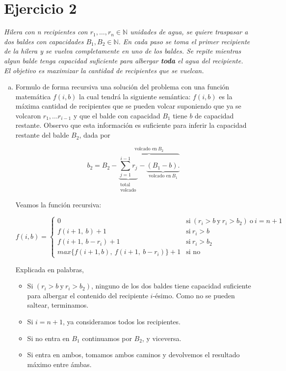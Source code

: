 \documentclass[12pt, a4paper]{report}
\theoremstyle{definition} %
\begin{document}
\section*{Ejercicio 2}

\textit{Hilera con n recipientes con $r_1, \ldots, r_n \in \mathbb{N}$ unidades de agua, se quiere traspasar a dos baldes con capacidades $B_1, B_2 \in \mathbb{N}$. En cada paso se toma el primer recipiente de la hilera y se vuelva completamente en uno de los baldes. Se repite mientras algun balde tenga capacidad suficiente para albergar \textbf{toda} el agua del recipiente. El objetivo es maximizar la cantidad de recipientes que se vuelcan.}

\begin{enumerate}[a)]
    \item Formulo de forma recursiva una solución del problema con una función matemática $f(i, b)$ la cual tendrá la siguiente semántica: $f(i, b)$ es la máxima cantidad de recipientes que se pueden volcar suponiendo que ya se volcaron $r_1, ... r_{i-1}$ y que el balde con capacidad $B_1$ tiene $b$ de capacidad restante. Observo que esta información es suficiente para inferir la capacidad restante del balde $B_2$, dada por 
    
    \[ 
        b_2 = B_2 -
            \overbrace{
            \underbrace{\sum_{j=1}^{i-1} r_j}_{\substack{\text{total}\\\text{volcado}}} - 
            \underbrace{(B_1 - b).}_{\text{volcado en} \ B_1}
            }^{\text{volcado en} \ B_2}
    \]

    Veamos la función recursiva:

    \[ 
        f(i, b) =
            \begin{cases}
                0 & \text{si} \ (r_i > b \ \text{y}\  r_i > b_2) \ \text{o} \ i = n+1 \\
                f(i+1,\ b) + 1 &\text{si}\ r_i > b\\
                f(i+1,\ b - r_i) + 1 &\text{si}\ r_i > b_2\\
                max\{f(i+1, b),\ f(i+1,\ b - r_i)\} + 1 &\text{si no}
            \end{cases}
    \]

    Explicada en palabras,

    \begin{itemize}
        \item Si $(r_i > b \ \text{y}\  r_i > b_2)$, ninguno de los dos baldes tiene capacidad suficiente para albergar el contenido del recipiente $i$-ésimo. Como no se pueden saltear, terminamos.
        \item Si $i = n + 1$, ya consideramos todos los recipientes.
        \item Si no entra en $B_1$ continuamos por $B_2$, y viceversa.
        \item Si entra en ambos, tomamos ambos caminos y devolvemos el resultado máximo entre ámbas.
    \end{itemize}


\end{enumerate}
\end{document}
